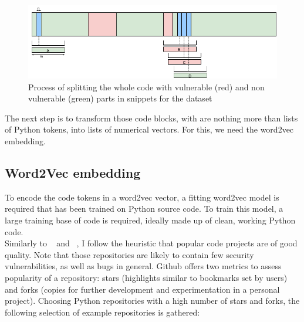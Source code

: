 \documentclass[
	a4paper,
	pagesize,
	pdftex,
	12pt,
	twoside, %
	BCOR=5mm, %
	ngerman,
	fleqn,
	final,
	]{scrartcl}
\begin{document}
\begin{figure}[ht]
	\centering
	\includegraphics[width=\linewidth]{img/FocusBlocks}
	\caption{Process of splitting the whole code with vulnerable (red) and non vulnerable (green) parts in snippets for the dataset}
	\label{fig:FocusBlocks}
\end{figure}

The next step is to transform those code blocks, with are nothing more than lists of Python tokens, into lists of numerical vectors. For this, we need the word2vec embedding. 

\subsection{Word2Vec embedding}
To encode the code tokens in a word2vec vector, a fitting word2vec model is required that has been trained on Python source code. To train this model, a large training base of code is required, ideally made up of clean, working Python code.\\
Similarly to ~\cite{Bhoopchand.2016} and ~\cite{Allamanis.2013}, I follow the  heuristic that popular code projects are of good quality. Note that those repositories are likely to contain few security vulnerabilities, as well as bugs in general. Github offers two metrics to assess popularity of a repository: stars (highlights similar to bookmarks set by users) and forks (copies for further development and experimentation in a personal project). Choosing Python repositories with a high number of stars and forks, the following selection of example repositories is gathered:
\end{document}
